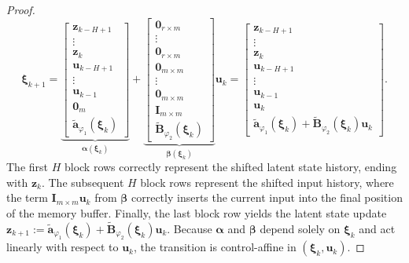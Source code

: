 \documentclass{article}
\begin{document}
\begin{proof}
\begin{equation}
\boldsymbol{\xi}_{k+1} =
\underbrace{\begin{bmatrix} \mathbf{z}_{k-H+1} \\ \vdots \\ \mathbf{z}_{k} \\ \mathbf{u}_{k-H+1} \\ \vdots \\ \mathbf{u}_{k-1} \\ \mathbf{0}_m \\ \widetilde{\mathbf{a}}_{\varphi_1}(\boldsymbol{\xi}_k) \end{bmatrix}}_{\boldsymbol{\alpha}(\boldsymbol{\xi}_k)}
+
\underbrace{\begin{bmatrix} \mathbf{0}_{r \times m} \\ \vdots \\ \mathbf{0}_{r \times m} \\ \mathbf{0}_{m \times m} \\ \vdots \\ \mathbf{0}_{m \times m} \\ \mathbf{I}_{m \times m} \\ \widetilde{\mathbf{B}}_{\varphi_2}(\boldsymbol{\xi}_k) \end{bmatrix}}_{\boldsymbol{\beta}(\boldsymbol{\xi}_k)} \mathbf{u}_k
=
\begin{bmatrix} \mathbf{z}_{k-H+1} \\ \vdots \\ \mathbf{z}_{k} \\ \mathbf{u}_{k-H+1} \\ \vdots \\ \mathbf{u}_{k-1} \\ \mathbf{u}_k \\ \widetilde{\mathbf{a}}_{\varphi_1}(\boldsymbol{\xi}_k) + \widetilde{\mathbf{B}}_{\varphi_2}(\boldsymbol{\xi}_k)\mathbf{u}_k \end{bmatrix}.
\end{equation}
The first $H$ block rows correctly represent the shifted latent state history, ending with $\mathbf{z}_k$. The subsequent $H$ block rows represent the shifted input history, where the term $\mathbf{I}_{m \times m} \mathbf{u}_k$ from $\boldsymbol{\beta}$ correctly inserts the current input into the final position of the memory buffer. Finally, the last block row yields the latent state update $\mathbf{z}_{k+1} := \widetilde{\mathbf{a}}_{\varphi_1}(\boldsymbol{\xi}_k) + \widetilde{\mathbf{B}}_{\varphi_2}(\boldsymbol{\xi}_k)\mathbf{u}_k$. Because $\boldsymbol{\alpha}$ and $\boldsymbol{\beta}$ depend solely on $\boldsymbol{\xi}_k$ and act linearly with respect to $\mathbf{u}_k$, the transition is control-affine in $(\boldsymbol{\xi}_k, \mathbf{u}_k)$.
\end{proof}
\end{document}
